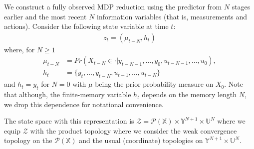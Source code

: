 \documentclass[11pt]{article}
\def\P{{\mathcal P}}
\begin{document}
 We construct a fully observed MDP reduction using the predictor from $N$ stages earlier and the most recent $N$ information variables (that is, measurements and actions). 
Consider the following state variable at time $t$:
\begin{align}\label{finite_belief_state}
{z}_t=(\mu_{t-N},h_t)
\end{align}
where, for $N\geq 1$
\begin{align*}
\mu_{t-N}&=Pr(X_{t-N}\in \cdot|y_{t-N-1},\dots,y_0,u_{t-N-1},\dots,u_0),\\
h_t&=\{y_t,\dots,y_{t-N},u_{t-1},\dots,u_{t-N}\}
\end{align*}
and $h_t=y_t$ for $N=0$
with $\mu$ being the prior probability measure on $X_0$. Note that although, the finite-memory variable $h_t$ depends on the memory length $N$, we drop this dependence for notational convenience. 


The state space with this representation is ${\mathcal{Z}}=\P(\mathds{X})\times \mathds{Y}^{N+1}\times \mathds{U}^{N}$ where we equip ${\mathcal{Z}}$ with the product topology where we consider the weak convergence topology on the $\P(\mathds{X})$ and the usual (coordinate) topologies on $\mathds{Y}^{N+1}\times \mathds{U}^{N}$. 
\end{document}
